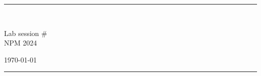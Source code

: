 \fancyhead[C]{}
\hrule \medskip
\begin{minipage}{0.295\textwidth} 
\raggedright
\footnotesize
\yourname \hfill\\
\youremail
\end{minipage}
\begin{minipage}{0.4\textwidth} 
\centering 
\large 
Lab session \# \assignmentnumber\\ 
\normalsize 
NPM 2024\\ 
\end{minipage}
\begin{minipage}{0.295\textwidth} 
\raggedleft
\today\hfill\\
\end{minipage}
\medskip\hrule 
\bigskip

